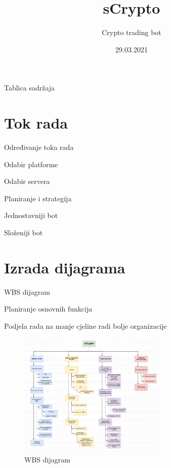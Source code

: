 \documentclass[aspectratio=169,xcolor=dvipsnames]{beamer}
\title[short title]{sCrypto}
\subtitle{Crypto trading bot}
\institute[RiTeh] 
{
Sveučilište u Rijeci - Tehnički fakultet 
}
\date{29.03.2021}
\begin{document}
\begin{frame}
  \titlepage
\end{frame}

\begin{frame}{Tablica sadržaja}
  \tableofcontents
\end{frame}

\section{Tok rada}

\begin{frame}{Određivanje toka rada}
    \item Odabir platforme
    \item Odabir servera
    \item Planiranje i strategija
    \item Jednostavniji bot
    \item Složeniji bot
\end{frame}


\section{Izrada dijagrama}

\begin{frame}{WBS dijagram}
    \item Planiranje osnovnih funkcija 
    \item Podjela rada na manje cjeline radi bolje organizacije
    \begin{figure}
        \centering
        \includegraphics[width=7cm]{wbs}
        \caption{WBS dijagram}
        \label{fig:wbs}
    \end{figure}
\end{frame}
\end{document}
